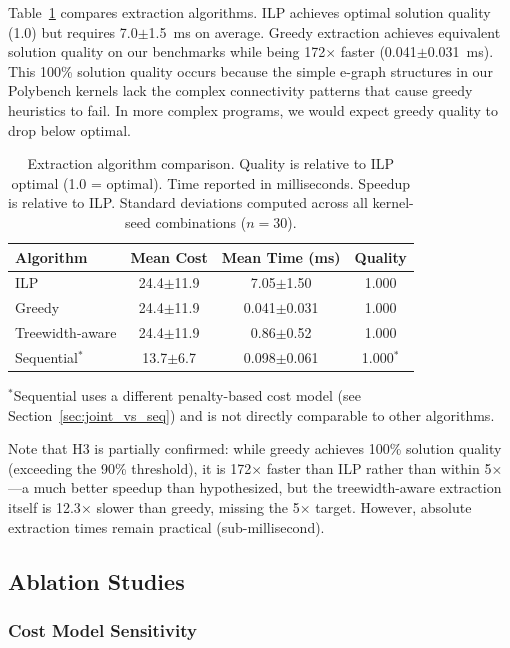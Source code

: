 \documentclass[11pt]{article}
\begin{document}
Table~\ref{tab:extraction_comparison} compares extraction algorithms. ILP achieves optimal solution quality (1.0) but requires 7.0$\pm$1.5~ms on average. Greedy extraction achieves equivalent solution quality on our benchmarks while being 172$\times$ faster (0.041$\pm$0.031~ms). This 100\% solution quality occurs because the simple e-graph structures in our Polybench kernels lack the complex connectivity patterns that cause greedy heuristics to fail. In more complex programs, we would expect greedy quality to drop below optimal.

\begin{table}[t]
\caption{Extraction algorithm comparison. Quality is relative to ILP optimal (1.0 = optimal). Time reported in milliseconds. Speedup is relative to ILP. Standard deviations computed across all kernel-seed combinations ($n=30$).}
\label{tab:extraction_comparison}
\centering
\begin{tabular}{lccc}
\toprule
Algorithm & Mean Cost & Mean Time (ms) & Quality \\
\midrule
ILP & 24.4$\pm$11.9 & 7.05$\pm$1.50 & 1.000 \\
Greedy & 24.4$\pm$11.9 & 0.041$\pm$0.031 & 1.000 \\
Treewidth-aware & 24.4$\pm$11.9 & 0.86$\pm$0.52 & 1.000 \\
Sequential$^*$ & 13.7$\pm$6.7 & 0.098$\pm$0.061 & 1.000$^*$ \\
\bottomrule
\end{tabular}
\begin{flushleft}
\small $^*$Sequential uses a different penalty-based cost model (see Section~\ref{sec:joint_vs_seq}) and is not directly comparable to other algorithms.
\end{flushleft}
\end{table}

Note that H3 is partially confirmed: while greedy achieves 100\% solution quality (exceeding the 90\% threshold), it is 172$\times$ faster than ILP rather than within 5$\times$---a much better speedup than hypothesized, but the treewidth-aware extraction itself is 12.3$\times$ slower than greedy, missing the 5$\times$ target. However, absolute extraction times remain practical (sub-millisecond).

\subsection{Ablation Studies}

\subsubsection{Cost Model Sensitivity}
\end{document}

